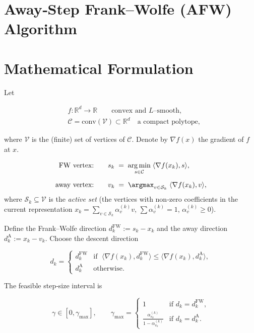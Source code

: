 \documentclass{article}
\newcommand{\argmin}{\mathop{\mathrm{arg\,min}}}
\newcommand{\conv}{\mathrm{conv}}
\newcommand{\R}{\mathbb{R}}
\begin{document}
\section*{Away‑Step Frank–Wolfe (AFW) Algorithm}

\section*{Mathematical Formulation}
Let  

\[
\begin{aligned}
&f:\R^{d}\rightarrow\R \qquad\text{convex and $L$–smooth,} \\
&\mathcal C = \conv(\mathcal V)\subset\R^{d}\quad\text{a compact polytope,}
\end{aligned}
\]

where $\mathcal V$ is the (finite) set of vertices of $\mathcal C$.
Denote by $\nabla f(x)$ the gradient of $f$ at $x$.

\[
\begin{aligned}
\text{FW vertex:}&\qquad s_k \;=\;\argmin_{s\in\mathcal C}\;\langle\nabla f(x_k),s\rangle,\\[2mm]
\text{away vertex:}&\qquad v_k \;=\;\argmax_{v\in\mathcal S_k}\;\langle\nabla f(x_k),v\rangle,
\end{aligned}
\]
where $\mathcal S_k\subseteq\mathcal V$ is the \emph{active set} (the vertices with non‑zero coefficients in the current representation
$x_k=\sum_{v\in\mathcal S_k}\alpha_v^{(k)}v$, $\sum\alpha_v^{(k)}=1$, $\alpha_v^{(k)}\ge0$).

Define the Frank–Wolfe direction $d^{\mathrm{FW}}_k:=s_k-x_k$ and the away direction
$d^{\mathrm{A}}_k:=x_k-v_k$.
Choose the descent direction

\[
d_k=
\begin{cases}
d^{\mathrm{FW}}_k & \text{if }\;\langle\nabla f(x_k),d^{\mathrm{FW}}_k\rangle
\le \langle\nabla f(x_k),d^{\mathrm{A}}_k\rangle,\\[1mm]
d^{\mathrm{A}}_k & \text{otherwise.}
\end{cases}
\]

The feasible step‑size interval is  

\[
\gamma\in[0,\gamma_{\max}],\qquad 
\gamma_{\max}=
\begin{cases}
1 & \text{if } d_k=d^{\mathrm{FW}}_k,\\[1mm]
\displaystyle\frac{\alpha_{v_k}^{(k)}}{1-\alpha_{v_k}^{(k)}} & \text{if } d_k=d^{\mathrm{A}}_k .
\end{cases}
\]
\end{document}
